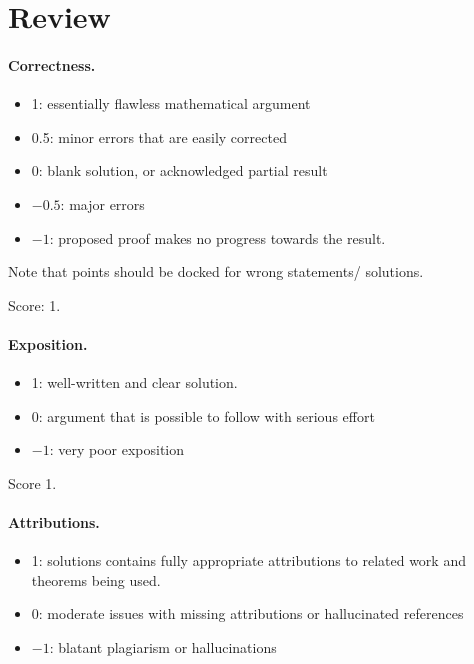 \documentclass[11pt]{article}
\begin{document}
\maketitle

\section{Review}

\paragraph{Correctness.}


\begin{itemize}
	\item  1: essentially flawless mathematical argument
	\item  0.5: minor errors that are easily corrected
	\item  0: blank solution, or acknowledged partial result
	\item  $-0.5$: major errors
	\item  $-1$: proposed proof makes no progress towards the result.
\end{itemize}
Note that points should be docked for wrong statements/ solutions.

\noindent Score: 1.

\paragraph{Exposition.}


\begin{itemize}
	\item  1: well-written and clear solution.
	\item  0: argument that is possible to follow with serious effort
	\item  $-1$: very poor exposition
\end{itemize}

\noindent Score 1.

\paragraph{Attributions.}
\begin{itemize}
	\item  1: solutions contains fully appropriate attributions
		to related work and theorems being used.
	\item  0: moderate issues with missing attributions or hallucinated references
	\item  $-1$: blatant plagiarism or hallucinations
\end{itemize}
\end{document}
